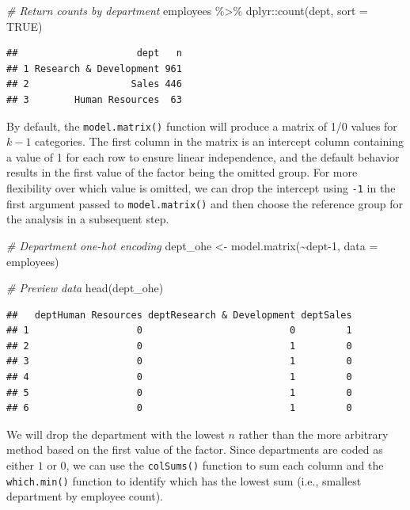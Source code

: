 \documentclass[
]{book}
\newenvironment{Shaded}{\begin{snugshade}}{\end{snugshade}}
\newcommand{\AttributeTok}[1]{\textcolor[rgb]{0.77,0.63,0.00}{#1}}
\newcommand{\CommentTok}[1]{\textcolor[rgb]{0.56,0.35,0.01}{\textit{#1}}}
\newcommand{\ConstantTok}[1]{\textcolor[rgb]{0.00,0.00,0.00}{#1}}
\newcommand{\DecValTok}[1]{\textcolor[rgb]{0.00,0.00,0.81}{#1}}
\newcommand{\FunctionTok}[1]{\textcolor[rgb]{0.00,0.00,0.00}{#1}}
\newcommand{\NormalTok}[1]{#1}
\newcommand{\OtherTok}[1]{\textcolor[rgb]{0.56,0.35,0.01}{#1}}
\newcommand{\SpecialCharTok}[1]{\textcolor[rgb]{0.00,0.00,0.00}{#1}}
\begin{document}
\begin{Shaded}
\begin{Highlighting}[]
\CommentTok{\# Return counts by department}
\NormalTok{employees }\SpecialCharTok{\%\textgreater{}\%}\NormalTok{ dplyr}\SpecialCharTok{::}\FunctionTok{count}\NormalTok{(dept, }\AttributeTok{sort =} \ConstantTok{TRUE}\NormalTok{)}
\end{Highlighting}
\end{Shaded}

\begin{verbatim}
##                     dept   n
## 1 Research & Development 961
## 2                  Sales 446
## 3        Human Resources  63
\end{verbatim}

By default, the \texttt{model.matrix()} function will produce a matrix of 1/0 values for \(k-1\) categories. The first column in the matrix is an intercept column containing a value of 1 for each row to ensure linear independence, and the default behavior results in the first value of the factor being the omitted group. For more flexibility over which value is omitted, we can drop the intercept using \texttt{-1} in the first argument passed to \texttt{model.matrix()} and then choose the reference group for the analysis in a subsequent step.

\begin{Shaded}
\begin{Highlighting}[]
\CommentTok{\# Department one{-}hot encoding}
\NormalTok{dept\_ohe }\OtherTok{\textless{}{-}} \FunctionTok{model.matrix}\NormalTok{(}\SpecialCharTok{\textasciitilde{}}\NormalTok{dept}\DecValTok{{-}1}\NormalTok{, }\AttributeTok{data =}\NormalTok{ employees)}

\CommentTok{\# Preview data}
\FunctionTok{head}\NormalTok{(dept\_ohe)}
\end{Highlighting}
\end{Shaded}

\begin{verbatim}
##   deptHuman Resources deptResearch & Development deptSales
## 1                   0                          0         1
## 2                   0                          1         0
## 3                   0                          1         0
## 4                   0                          1         0
## 5                   0                          1         0
## 6                   0                          1         0
\end{verbatim}

We will drop the department with the lowest \(n\) rather than the more arbitrary method based on the first value of the factor. Since departments are coded as either \(1\) or \(0\), we can use the \texttt{colSums()} function to sum each column and the \texttt{which.min()} function to identify which has the lowest sum (i.e., smallest department by employee count).
\end{document}
